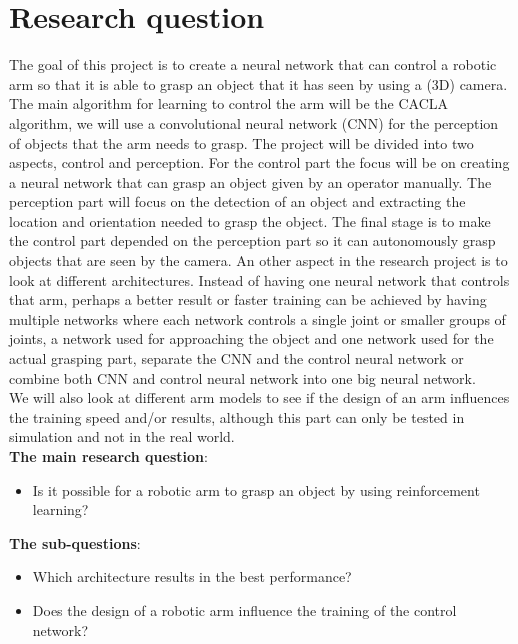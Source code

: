 \section{Research question}
The goal of this project is to create a neural network that can control a robotic arm so that it is able to grasp an object that it has seen by using a (3D) camera. 
The main algorithm for learning to control the arm will be the CACLA algorithm, we will use a convolutional neural network (CNN) for the perception of objects that the arm needs to grasp. 
The project will be divided into two aspects, control and perception. For the control part the focus will be on creating a neural network that can grasp an object given by an operator manually. The perception part 
will focus on the detection of an object and extracting the location and orientation needed to grasp the object. The final stage is to make the control part depended on the perception part so it can autonomously grasp objects
that are seen by the camera. An other aspect in the research project is to look at different architectures. Instead of having one neural network that controls that arm, perhaps a better result or faster training can be 
achieved by having multiple networks where each network controls a single joint or smaller groups of joints, a network used for approaching the object and one network used for the actual grasping part, separate the CNN and 
the control neural network or combine both CNN and control neural network into one big neural network. \\
We will also look at different arm models to see if the design of an arm influences the training speed and/or results, although this part can only be tested in simulation and not in the real world.  \\
\textbf{The main research question}:    
\begin{itemize}
  \item  Is it possible for a robotic arm to grasp an object by using reinforcement learning?
\end{itemize}                                
\textbf{The sub-questions}: 
\begin{itemize}
  \item Which architecture results in the best performance? 
  \item Does the design of a robotic arm influence the training of the control network?
\end{itemize}

